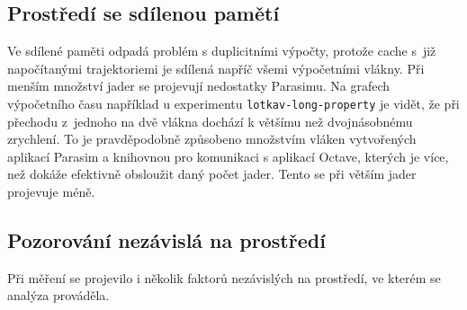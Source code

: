 \subsection{Prostředí se sdílenou pamětí}

Ve sdílené paměti odpadá problém s duplicitními výpočty, protože cache s~již napočítanými
trajektoriemi je sdílená napříč všemi výpočetními vlákny. Při menším množství jader se
projevují nedostatky Parasimu. Na grafech výpočetního času například u experimentu \texttt{lotkav-long-property}
je vidět, že při přechodu z~jednoho na dvě vlákna dochází k většímu než dvojnásobnému zrychlení. To je pravděpodobně způsobeno
množstvím vlá\-ken vytvořených aplikací Parasim a knihovnou pro komunikaci s aplikací Octave,
kterých je více, než dokáže efektivně obsloužit daný počet jader. Tento  se
při větším jader projevuje méně.

\subsection{Pozorování nezávislá na prostředí}

Při měření se projevilo i několik faktorů nezávislých na prostředí, ve kterém se
analýza prováděla.

